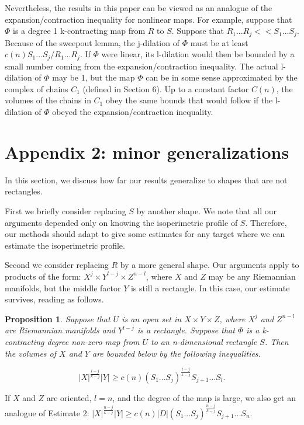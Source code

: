 \documentclass{amsart}
\newtheorem*{Theorem 1}{Theorem 1}
\newtheorem*{Theorem 2}{Theorem 2}
\newtheorem*{Estimate 1}{Estimate 1}
\newtheorem*{Estimate 2}{Estimate 2}
\newtheorem*{key lemma}{Key Lemma}
\newtheorem{prop}{Proposition}[section]
\numberwithin{equation}{section}
\begin{document}
Nevertheless, the results in this paper can be viewed as an
analogue of the expansion/contraction inequality for nonlinear
maps.  For example, suppose that $\Phi$ is a degree 1
k-contracting map from $R$ to $S$.  Suppose that $R_1 ... R_j <<
S_1 ... S_j$.  Because of the sweepout lemma, the j-dilation of
$\Phi$ must be at least $c(n) S_1 ... S_j / R_1 ... R_j$.  If
$\Phi$ were linear, its l-dilation would then be bounded by a
small number coming from the expansion/contraction inequality. 
The actual l-dilation of $\Phi$ may be 1, but the map $\Phi$ can
be in some sense approximated by the complex of chains $C_1$
(defined in Section 6).  Up to a constant factor $C(n)$, the
volumes of the chains in $C_1$ obey the same bounds that would
follow if the l-dilation of $\Phi$ obeyed the
expansion/contraction inequality.

\section{Appendix 2: minor generalizations}

In this section, we discuss how far our results generalize to
shapes that are not rectangles.

First we briefly consider replacing $S$ by another shape.  We
note that all our arguments depended only on knowing the
isoperimetric profile of $S$.  Therefore, our methods should
adapt to give some estimates for any target where we can
estimate the isoperimetric profile.

Second we consider replacing $R$ by a more general shape.  Our
arguments apply to products of the form: $X^j \times Y^{l-j}
\times Z^{n-l}$, where $X$ and $Z$ may be any Riemannian
manifolds, but the middle factor $Y$ is still a rectangle.  In
this case, our estimate survives, reading as follows.

\begin{prop} Suppose that $U$ is an open set in $X \times Y
\times Z$, where $X^j$ and $Z^{n-l}$ are Riemannian manifolds
and $Y^{l-j}$ is a rectangle.  Suppose that $\Phi$ is a
k-contracting degree non-zero map from $U$ to an n-dimensional
rectangle $S$.  Then the volumes of $X$ and $Y$ are bounded below
by the following inequalities.

$$|X|^{\frac{l-j}{k-j}} |Y| \ge c(n) (S_1 ...
S_j)^{\frac{l-j}{k-j}} S_{j+1} ... S_l.$$

\end{prop}

If $X$ and $Z$ are oriented, $l=n$, and the degree of the map is
large, we also get an analogue of Estimate 2:
$|X|^{\frac{n-j}{k-j}} |Y| \ge c(n) |D| (S_1 ...
S_j)^{\frac{n-j}{k-j}} S_{j+1} ... S_n$.
\end{document}
